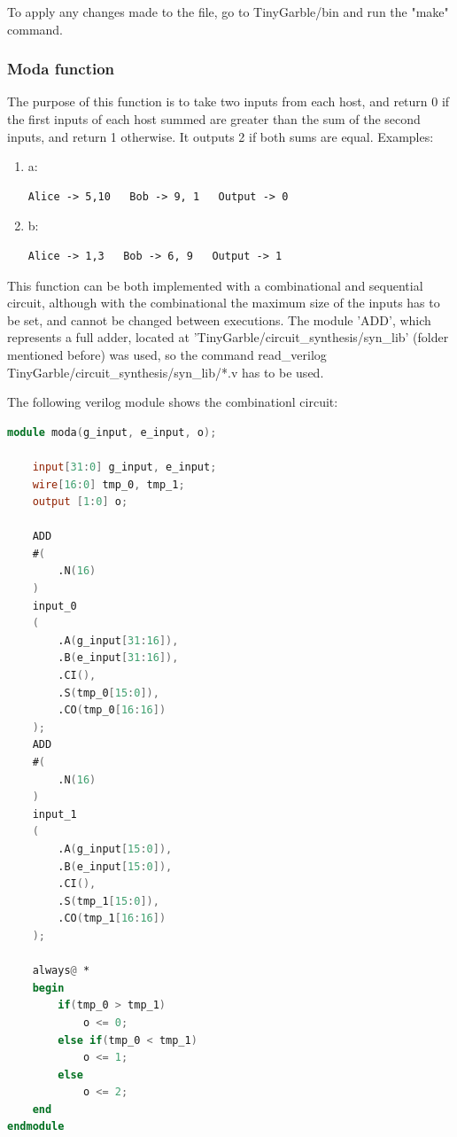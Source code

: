 \begin{refsection}
To apply any changes made to the file, go to TinyGarble/bin and run the "make" command.

\subsubsection{Moda function}

The purpose of this function is to take two inputs from each host, and return 0 if the first inputs of each host summed are greater than the sum of the second inputs, and return 1 otherwise. It outputs 2 if both sums are equal.
Examples:
\begin{enumerate}
\item a: \begin{lstlisting}[caption={Example of moda inputs and output}, captionpos=b]
Alice -> 5,10   Bob -> 9, 1   Output -> 0
\end{lstlisting}
\item b: \begin{lstlisting}[caption={Example of moda inputs and output}, captionpos=b]
Alice -> 1,3   Bob -> 6, 9   Output -> 1
\end{lstlisting}
\end{enumerate}

This function can be both implemented with a combinational and sequential circuit, although with the combinational the maximum size of the inputs has to be set, and cannot be changed between executions.
The module 'ADD', which represents a full adder, located at 'TinyGarble/circuit\_synthesis/syn\_lib' (folder mentioned before) was used, so the command read\_verilog TinyGarble/circuit\_synthesis/syn\_lib/*.v has to be used.

The following verilog module shows the combinationl circuit:

\newpage

\begin{lstlisting}[caption={moda.v}, language=Verilog, captionpos=b]
module moda(g_input, e_input, o);

	input[31:0] g_input, e_input;
	wire[16:0] tmp_0, tmp_1;
	output [1:0] o;

	ADD 
	#(
		.N(16)
	)
	input_0
	(
		.A(g_input[31:16]),
		.B(e_input[31:16]),
		.CI(),
		.S(tmp_0[15:0]),
		.CO(tmp_0[16:16])
	);
	ADD 
	#(
		.N(16)
	)
	input_1
	(
		.A(g_input[15:0]),
		.B(e_input[15:0]),
		.CI(),
		.S(tmp_1[15:0]),
		.CO(tmp_1[16:16])
	);	

	always@ *
	begin
		if(tmp_0 > tmp_1)
			o <= 0;
		else if(tmp_0 < tmp_1)
			o <= 1;
		else
			o <= 2;
	end
endmodule
\end{lstlisting}


\end{refsection}
